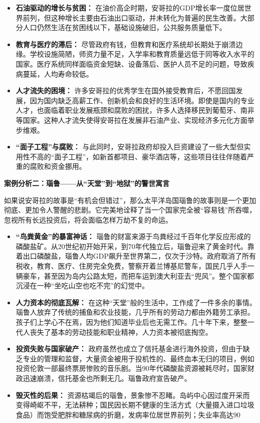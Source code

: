 \begin{itemize}
    \item \textbf{石油驱动的增长与贫困：} 在油价高企时期，安哥拉的GDP增长率一度位居世界前列，但这种增长主要由石油出口驱动，并未转化为普遍的民生改善。大部分人口仍然生活在贫困线以下，基础设施破旧，公共服务质量低下。
    \item \textbf{教育与医疗的滞后：} 尽管政府有钱，但教育和医疗系统却长期处于崩溃边缘。学校设施简陋，师资力量不足，入学率和教育质量远低于同等收入水平的国家。医疗系统同样面临资金短缺、设备落后、医护人员不足的问题，导致疾病蔓延，人均寿命较低。
    \item \textbf{人才流失的困境：} 许多安哥拉的优秀学生在国外接受教育后，不愿回国发展，因为国内缺乏高薪工作、创新机会和良好的生活环境。即使是国内的专业人才，也面临着职业发展瓶颈和腐败的困扰，许多人选择移民到葡萄牙、南非等国家。这种人才流失使得安哥拉在发展非石油产业、实现经济多元化方面举步维艰。
    \item \textbf{“面子工程”与腐败：} 与此同时，安哥拉政府却投入巨资建设了一些大型但实用性不高的“面子工程”，如新首都项目、豪华酒店等，这些项目往往伴随着严重的腐败和资金挪用。
\end{itemize}

\textbf{案例分析二：瑙鲁——从“天堂”到“地狱”的警世寓言}

如果说安哥拉的故事是“有机会但错过”，那么太平洋岛国瑙鲁的故事则是一个更加彻底、更加令人警醒的悲剧。它完美地诠释了当一个国家完全被“容易钱”所吞噬，忽视所有长远投资后，将会面临怎样万劫不复的命运。

\begin{itemize}
    \item \textbf{“鸟粪黄金”的暴富神话：} 瑙鲁的财富来源于鸟粪经过千百年化学反应形成的磷酸盐矿。从20世纪初开始开采，到70年代独立后，瑙鲁迎来了黄金时代。靠着出口磷酸盐，瑙鲁人均GDP飙升至世界第二，仅次于沙特。政府取消了所有税收，教育、医疗、住房完全免费，警察开着兰博基尼警车，国民几乎人手一辆豪车，甚至因为岛内公路太短，而把车运到澳大利亚去“兜风”。整个国家都沉浸在一种“坐吃山空也吃不完”的幻觉中。
    \item \textbf{人力资本的彻底瓦解：} 在这种“天堂”般的生活中，工作成了一件多余的事情。瑙鲁人放弃了传统的捕鱼和农业技能，几乎所有的劳动力都由外籍劳工承担。孩子们上学心不在焉，因为他们知道毕业后也无需工作。几十年下来，整整一代人丧失了基本的劳动技能和职业精神，人力资本被彻底掏空。
    \item \textbf{投资失败与国家破产：} 政府虽然也成立了信托基金进行海外投资，但由于缺乏专业的管理和监督，大量资金被用于投机性的、最终血本无归的项目，例如投资伦敦一部最终票房惨败的音乐剧。当90年代磷酸盐资源被耗尽时，国家财政迅速崩溃，信托基金也所剩无几。瑙鲁政府宣告破产。
    \item \textbf{毁灭性的后果：} 资源枯竭后的瑙鲁，景象惨不忍睹。岛屿中心因过度开采而变得崎岖不平，无法耕种；国民因长期不健康的生活方式（大量摄入进口垃圾食品）而饱受肥胖和糖尿病的折磨，发病率位居世界前列；失业率高达90%
\end{itemize}

